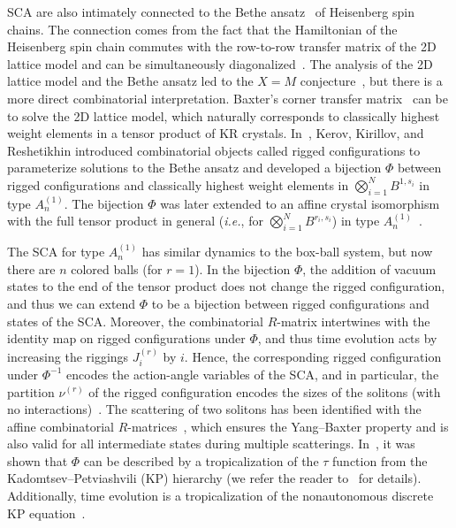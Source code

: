 \documentclass[reqno]{amsart}
\theoremstyle{plain}
\theoremstyle{definition}
\numberwithin{equation}{section}
\begin{document}
SCA are also intimately connected to the Bethe ansatz~\cite{B31} of Heisenberg spin chains.
The connection comes from the fact that the Hamiltonian of the Heisenberg spin chain commutes with the row-to-row transfer matrix of the 2D lattice model and can be simultaneously diagonalized~\cite{KKMMNN91}.
The analysis of the 2D lattice model and the Bethe ansatz led to the $X = M$ conjecture~\cite{HKOTY99, HKOTT02}, but there is a more direct combinatorial interpretation.
Baxter's corner transfer matrix~\cite{B89} can be to solve the 2D lattice model, which naturally corresponds to classically highest weight elements in a tensor product of KR crystals.
In~\cite{KKR86, KR86}, Kerov, Kirillov, and Reshetikhin introduced combinatorial objects called rigged configurations to parameterize solutions to the Bethe ansatz and developed a bijection $\Phi$ between rigged configurations and classically highest weight elements in $\bigotimes_{i=1}^N B^{1,s_i}$ in type $A_n^{(1)}$.
The bijection $\Phi$ was later extended to an affine crystal isomorphism with the full tensor product in general (\textit{i.e.}, for $\bigotimes_{i=1}^N B^{r_i, s_i}$) in type $A_n^{(1)}$~\cite{DS06, KSS02, SW10}.

The SCA for type $A_n^{(1)}$ has similar dynamics to the box-ball system, but now there are $n$ colored balls (for $r = 1$).
In the bijection $\Phi$, the addition of vacuum states to the end of the tensor product does not change the rigged configuration, and thus we can extend $\Phi$ to be a bijection between rigged configurations and states of the SCA.
Moreover, the combinatorial $R$-matrix intertwines with the identity map on rigged configurations under $\Phi$, and thus time evolution acts by increasing the riggings $J_i^{(r)}$ by $i$.
Hence, the corresponding rigged configuration under $\Phi^{-1}$ encodes the action-angle variables of the SCA, and in particular, the partition $\nu^{(r)}$ of the rigged configuration encodes the sizes of the solitons (with no interactions)~\cite{KNTW18,KS09,KOSTY06,Takagi05}.
The scattering of two solitons has been identified with the affine combinatorial $R$-matrices~\cite{KSY07,Sakamoto08}, which ensures the Yang--Baxter property and is also valid for all intermediate states during multiple scatterings.
In~\cite{KSY07}, it was shown that $\Phi$ can be described by a tropicalization of the $\tau$ function from the Kadomtsev--Petviashvili (KP) hierarchy (we refer the reader to~\cite{JM83} for details).
Additionally, time evolution is a tropicalization of the nonautonomous discrete KP equation~\cite{HHIKTT01}.
\end{document}

